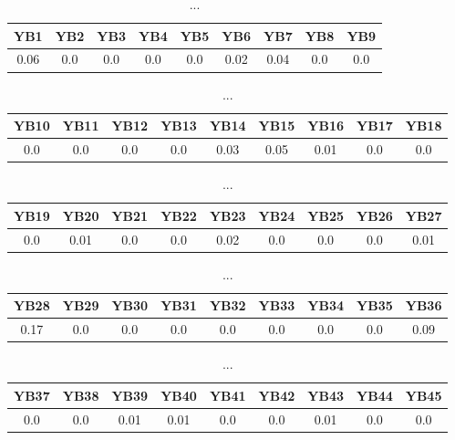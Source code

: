 \documentclass[]{article}
\begin{document}
\begin{table}[h]
      \centering
      \begin{tabular}{|c|c|c|c|c|c|c|c|c|}
            \hline
            YB1  & YB2 & YB3 & YB4 & YB5 & YB6  & YB7  & YB8 & YB9 \\
            \hline
            0.06 & 0.0 & 0.0 & 0.0 & 0.0 & 0.02 & 0.04 & 0.0 & 0.0 \\
            \hline
      \end{tabular}
      \caption{...}
\end{table}
\begin{table}[h]
      \centering
      \begin{tabular}{|c|c|c|c|c|c|c|c|c|}
            \hline
            YB10 & YB11 & YB12 & YB13 & YB14 & YB15 & YB16 & YB17 & YB18 \\
            \hline
            0.0  & 0.0  & 0.0  & 0.0  & 0.03 & 0.05 & 0.01 & 0.0  & 0.0  \\
            \hline
      \end{tabular}
      \caption{...}
\end{table}
\begin{table}[h]
      \centering
      \begin{tabular}{|c|c|c|c|c|c|c|c|c|}
            \hline
            YB19 & YB20 & YB21 & YB22 & YB23 & YB24 & YB25 & YB26 & YB27 \\
            \hline
            0.0  & 0.01 & 0.0  & 0.0  & 0.02 & 0.0  & 0.0  & 0.0  & 0.01 \\
            \hline
      \end{tabular}
      \caption{...}
\end{table}
\begin{table}[h]
      \centering
      \begin{tabular}{|c|c|c|c|c|c|c|c|c|}
            \hline
            YB28 & YB29 & YB30 & YB31 & YB32 & YB33 & YB34 & YB35 & YB36 \\
            \hline
            0.17 & 0.0  & 0.0  & 0.0  & 0.0  & 0.0  & 0.0  & 0.0  & 0.09 \\
            \hline
      \end{tabular}
      \caption{...}
\end{table}
\begin{table}[h]
      \centering
      \begin{tabular}{|c|c|c|c|c|c|c|c|c|}
            \hline
            YB37 & YB38 & YB39 & YB40 & YB41 & YB42 & YB43 & YB44 & YB45 \\
            \hline
            0.0  & 0.0  & 0.01 & 0.01 & 0.0  & 0.0  & 0.01 & 0.0  & 0.0  \\
            \hline
      \end{tabular}
      \caption{...}
\end{table}
\end{document}
